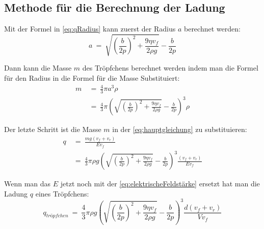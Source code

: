 \subsection{Methode für die Berechnung der Ladung}\label{sub:methodeBerechnung}
Mit der Formel in \autoref{eq:qRadius} kann zuerst der Radius $a$ berechnet werden:
\begin{equation*}
	a \ = \ \sqrt{\left( \frac{b}{2p}\right)^2 + \frac{9\eta v_f}{2\rho g}} - \frac{b}{2p}
\end{equation*}

\noindent Dann kann die Masse $m$ des Tröpfchens berechnet werden indem man die Formel für den Radius in die Formel für die Masse Substituiert:
\begin{equation*}
	\begin{split}
		m & \ = \ \frac{4}{3}\pi a^3 \rho \\
		& \ = \ \frac{4}{3}\pi \left( \sqrt{\left( \frac{b}{2p}\right)^2 + \frac{9\eta v_f}{2\rho g}} - \frac{b}{2p} \right)^3 \rho
	\end{split}
\end{equation*}

\noindent Der letzte Schritt ist die Masse $m$ in der \autoref{eq:hauptgleichung} zu substituieren:
\begin{equation*}
	\begin{split}
		q & \ = \ \frac{m g (v_f + v_r)}{Ev_f} \\
		& \ = \ \frac{4}{3} \pi \rho g \left( \sqrt{\left( \frac{b}{2p}\right)^2 + \frac{9\eta v_f}{2\rho g}} - \frac{b}{2p} \right)^3 \frac{(v_f + v_r)}{Ev_f}
	\end{split}
\end{equation*}

\noindent Wenn man das $E$ jetzt noch mit der \autoref{eq:elektrischeFeldstärke} ersetzt hat man die Ladung $q$ eines Tröpfchens:
\begin{equation*}
	q_{tröpfchen} \ = \ \frac{4}{3} \pi \rho g \left( \sqrt{\left( \frac{b}{2p}\right)^2 + \frac{9\eta v_f}{2\rho g}} - \frac{b}{2p} \right)^3 \frac{d(v_f + v_r)}{Vv_f}
\end{equation*}







